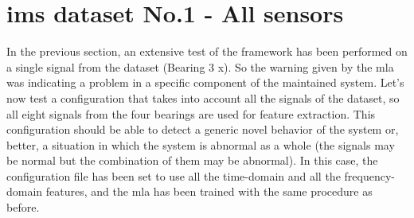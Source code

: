 \section{\gls{ims} dataset No.1 - All sensors}
In the previous section, an extensive test of the framework has been performed on a single signal from the dataset (Bearing 3 x). So the warning given by the \gls{mla} was indicating a problem in a specific component of the maintained system. Let's now test a configuration that takes into account all the signals of the dataset, so all eight signals from the four bearings are used for feature extraction. This configuration should be able to detect a generic novel behavior of the system or, better, a situation in which the system is abnormal as a whole (the signals may be normal but the combination of them may be abnormal).  In this case, the configuration file has been set to use all the time-domain and all the frequency-domain features, and the \gls{mla} has been trained with the same procedure as before. 
\todo
